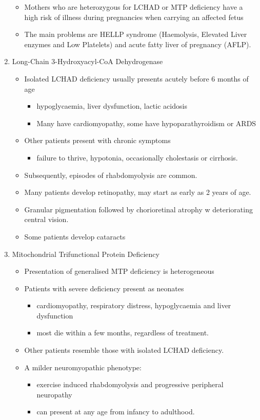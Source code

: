 \documentclass{scrartcl}
\begin{document}
\begin{enumerate}
\begin{itemize}
\item Mothers who are heterozygous for LCHAD or MTP deficiency have a high
risk of illness during pregnancies when carrying an affected fetus
\item The main problems are HELLP syndrome (Haemolysis, Elevated Liver
enzymes and Low Platelets) and acute fatty liver of pregnancy
(AFLP).
\end{itemize}

\item Long-Chain 3-Hydroxyacyl-CoA Dehydrogenase
\label{sec:orgd3f23b0}
\begin{itemize}
\item Isolated LCHAD deficiency usually presents acutely before 6 months of age
\begin{itemize}
\item hypoglycaemia, liver dysfunction, lactic acidosis
\item Many have cardiomyopathy, some have hypoparathyroidism or ARDS
\end{itemize}
\item Other patients present with chronic symptoms
\begin{itemize}
\item failure to thrive, hypotonia, occasionally cholestasis or cirrhosis.
\end{itemize}
\item Subsequently, episodes of rhabdomyolysis are common.
\item Many patients develop retinopathy, may start as early as 2 years of age.
\item Granular pigmentation followed by chorioretinal atrophy w deteriorating central vision.
\item Some patients develop cataracts
\end{itemize}

\item Mitochondrial Trifunctional Protein Deficiency
\label{sec:orga06ad25}
\begin{itemize}
\item Presentation of generalised MTP deficiency is heterogeneous
\item Patients with severe deficiency present as neonates
\begin{itemize}
\item cardiomyopathy, respiratory distress, hypoglycaemia and liver dysfunction
\item most die within a few months, regardless of treatment.
\end{itemize}
\item Other patients resemble those with isolated LCHAD deficiency.
\item A milder neuromyopathic phenotype:
\begin{itemize}
\item exercise induced rhabdomyolysis and progressive peripheral
neuropathy
\item can present at any age from infancy to adulthood.
\end{itemize}
\end{itemize}


\end{enumerate}
\end{document}
